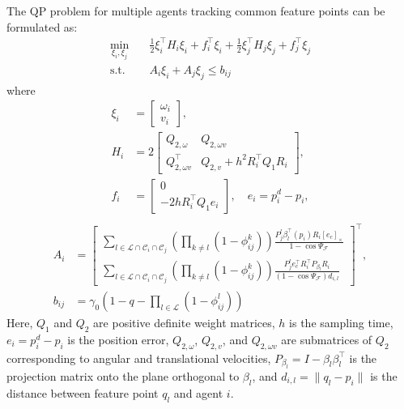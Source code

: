 \documentclass[fleqn,10pt,twocolumn]{SICE_FES25}
\theoremstyle{definition}
\theoremstyle{plain}
\begin{document}
The QP problem for multiple agents tracking common feature points can be formulated as:
\begin{equation}
\begin{aligned}
\min_{\xi_i, \xi_j} \quad & \frac{1}{2}\xi_i^\top H_i \xi_i + f_i^\top \xi_i + \frac{1}{2}\xi_j^\top H_j \xi_j + f_j^\top \xi_j \\
\mathrm{s.t.} \quad & A_i \xi_i + A_j \xi_j \leq b_{ij}
\label{eq:common_cbf_qp}
\end{aligned}
\end{equation}
where
\begin{equation}
\begin{aligned}
\xi_i &= \begin{bmatrix} \omega_i \\ v_i \end{bmatrix}, \\
H_i &= 2\begin{bmatrix} Q_{2,\omega} & Q_{2,\omega v} \\ Q_{2,\omega v}^\top & Q_{2,v} + h^2 R_i^\top Q_1 R_i \end{bmatrix},\\
f_i &= \begin{bmatrix} 0 \\ -2h R_i^\top Q_1 e_i \end{bmatrix}, \quad e_i = p^d_i - p_i, \\
\label{eq:common_cbf_qp_params}
\end{aligned}
\end{equation}
\begin{equation}
\begin{aligned}
A_i &= \begin{bmatrix}
\sum_{l \in {\mathcal{L}} \cap {\mathcal{C}}_i \cap {\mathcal{C}}_j}\left(\prod_{k \neq l}(1 - \phi_{ij}^k)\right) \frac{P_j^l\beta_l^\top(p_i) R_i [e_c]_\times}{1 - \cos\Psi_{\mathcal{F}}} \\
\sum_{l \in {\mathcal{L}} \cap {\mathcal{C}}_i \cap {\mathcal{C}}_j}\left(\prod_{k \neq l}(1 - \phi_{ij}^k)\right)\frac{P_j^le_c^\top R_i^\top P_{\beta_l}R_i}{(1 - \cos\Psi_{\mathcal{F}})d_{i,l}}
\end{bmatrix}^\top, \\
b_{ij} &= \gamma_0 \left(1 - q - \prod_{l \in {\mathcal{L}}}(1 - \phi_{ij}^l)\right)
\label{eq:common_cbf_qp_params}
\end{aligned}
\end{equation}
Here, $Q_1$ and $Q_2$ are positive definite weight matrices, $h$ is the sampling time, $e_i = p^d_i - p_i$ is the position error, $Q_{2,\omega}$, $Q_{2,v}$, and $Q_{2,\omega v}$ are submatrices of $Q_2$ corresponding to angular and translational velocities, $P_{\beta_l} = I - \beta_l\beta_l^\top$ is the projection matrix onto the plane orthogonal to $\beta_l$, and $d_{i,l} = \|q_l-p_i\|$ is the distance between feature point $q_l$ and agent $i$.
\end{document}
